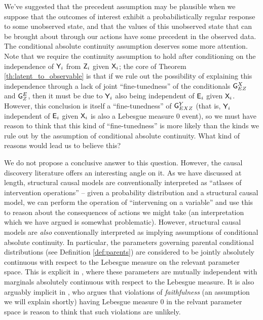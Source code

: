 We've suggested that the precedent assumption may be plausible when we suppose that the outcomes of interest exhibit a probabilistically regular response to some unobserved state, and that the values of this unobserved state that can be brought about through our actions have some precedent in the observed data. The conditional absolute continuity assumption deserves some more attention. Note that we require the continuity assumption to hold after conditioning on the independence of $\mathsf{Y}_i$ from $\mathsf{Z}_i$ given $\mathsf{X}_i$; the core of Theorem \ref{th:latent_to_observable} is that if we rule out the possibility of explaining this independence through a lack of joint ``fine-tunedness'' of the conditionals $\mathsf{G}^{X}_{EZ}$ and $\mathsf{G}^{E}_{Z}$, then it must be due to $\mathsf{Y}_i$ also being independent of $\mathsf{E}_i$ given $\mathsf{X}_i$. However, this conclusion is itself a ``fine-tunedness'' of $\mathsf{G}^Y_{EXZ}$ (that is, $\mathsf{Y}_i$ independent of $\mathsf{E}_i$ given $\mathsf{X}_i$ is also a Lebesgue measure 0 event), so we must have reason to think that this kind of ``fine-tunedness'' is more likely than the kinds we rule out by the assumption of conditional absolute continuity. What kind of reasons would lead us to believe this?

We do not propose a conclusive answer to this question. However, the causal discovery literature offers an interesting angle on it. As we have discussed at length, structural causal models are conventionally interpreted as ``atlases of intervention operations'' -- given a probability distribution and a structural causal model, we can perform the operation of ``intervening on a variable'' and use this to reason about the consequences of actions we might take (an interpretation which we have argued is somewhat problematic). However, structural causal models are \emph{also} conventionally interpreted as implying assumptions of conditional absolute continuity. In particular, the parameters governing parental conditional distributions (see Definition \ref{def:parents}) are considered to be jointly absolutely continuous with respect to the Lebesgue measure on the relevant parameter space. This is explicit in \citet{heckerman_learning_1995}, where these parameters are mutually independent with marginals absolutely continuous with respect to the Lebesgue measure. It is also arguably implicit in \citet{meek_strong_1995}, who argues that violations of \emph{faithfulness} (an assumption we will explain shortly) having Lebesgue measure 0 in the relvant parameter space is reason to think that such violations are unlikely.

